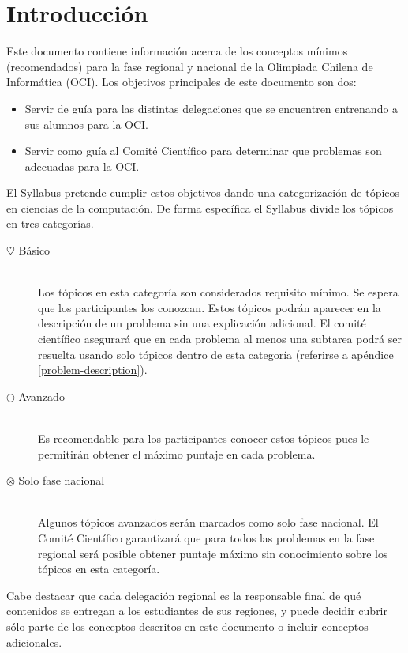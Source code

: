 \documentclass{article}
\newcommand{\basic}{$\heartsuit$}
\newcommand{\advanced}{$\ominus$}
\newcommand{\ultra}{$\otimes$}
\begin{document}
\section{Introducción}\label{sec:intro}
Este documento contiene información acerca de los conceptos mínimos (recomendados)
para la fase regional y nacional de la Olimpiada Chilena de Informática (OCI).
Los objetivos principales de este documento son dos:
\begin{itemize}
  \item Servir de guía para las distintas delegaciones que se encuentren
    entrenando a sus alumnos para la OCI.
  \item Servir como guía al Comité Científico para determinar que problemas son
    adecuadas para la OCI.
\end{itemize}
El Syllabus pretende cumplir estos objetivos dando una categorización de tópicos
en ciencias de la computación.
De forma específica el Syllabus divide los tópicos en tres categorías.
\begin{description}
\item[\basic{} Básico]
  \hspace{1em} \\
  Los tópicos en esta categoría son considerados requisito mínimo.
    Se espera que los participantes los conozcan.
    Estos tópicos podrán aparecer en la descripción de un problema sin una
    explicación adicional.
    El comité científico asegurará que en cada problema al menos una subtarea podrá
    ser resuelta usando solo tópicos dentro de esta categoría (referirse a
    apéndice \ref{problem-description}).
  \item[\advanced{} Avanzado]
    \hspace{1em} \\
    Es recomendable para los participantes conocer estos tópicos
    pues le permitirán obtener el máximo puntaje en cada problema.
  \item[\ultra{} Solo fase nacional]
    \hspace{1em} \\
    Algunos tópicos avanzados serán marcados como solo fase nacional.
    El Comité Científico garantizará que para todos las problemas en la fase
    regional será posible obtener puntaje máximo sin conocimiento sobre los
    tópicos en esta categoría.
\end{description}

Cabe destacar que cada delegación regional es la responsable final de qué
contenidos se entregan a los estudiantes de sus regiones, y puede decidir cubrir
sólo parte de los conceptos descritos en este documento o incluir conceptos
adicionales.
\end{document}
